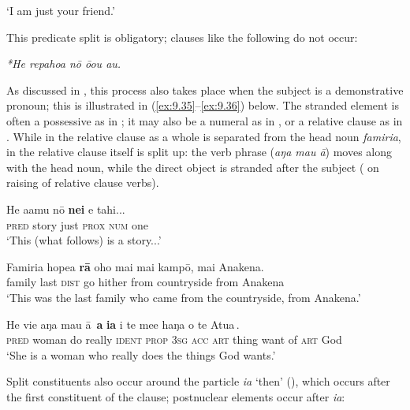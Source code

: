 \glt
‘I am just your friend.’ \textstyleExampleref{[R308.032]} 
\z

This predicate split is obligatory; clauses like the following do not occur:

\ea\label{ex:9.34}
\textit{*He repahoa nō ō{\ꞌ}ou au.}
\z

As discussed in , this process also takes place when the subject is a demonstrative pronoun; this is illustrated in (\ref{ex:9.35}–\ref{ex:9.36}) below. The stranded element is often a possessive as in ; it may also be a numeral as in , or a relative clause as in . While in  the relative clause as a whole is separated from the head noun \textit{famiria}, in  the relative clause itself is split up: the verb phrase (\textit{aŋa mau {\ꞌ}ā}) moves along with the head noun, while the direct object is stranded after the subject ( on raising of relative clause verbs). 

\ea\label{ex:9.35}
\gll He {\ꞌ}a{\ꞌ}amu nō \textbf{nei} e tahi...\\
\textsc{pred} story just \textsc{prox} \textsc{num} one\\

\glt 
‘This (what follows) is a story...’ \textstyleExampleref{[Luke 11:5]}
\z

\ea\label{ex:9.36}
\gll Famiria hope{\ꞌ}a \textbf{rā} oho mai mai kampō, mai {\ꞌ}Anakena. \\
family last \textsc{dist} go hither from countryside from Anakena \\

\glt 
‘This was the last family who came from the countryside, from Anakena.’ \textstyleExampleref{[R413.889]} 
\z

\ea\label{ex:9.37}
\gll He vi{\ꞌ}e {\ob}aŋa mau {\ꞌ}ā\,{\cb} \textbf{a} \textbf{ia} {\ob}i te me{\ꞌ}e haŋa o te {\ꞌ}Atua\,{\cb}. \\
\textsc{pred} woman {\db}do really \textsc{ident} \textsc{prop} \textsc{3sg} {\db}\textsc{acc} \textsc{art} thing want of \textsc{art} God \\

\glt
‘She is a woman who really does the things God wants.’ \textstyleExampleref{[1 Tim. 5:10]}
\z

Split constituents also occur around the particle \textit{ia} ‘then’ (), which occurs after the first constituent of the clause; postnuclear elements occur after \textit{ia}:

